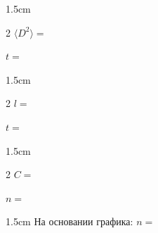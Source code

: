\begin{answerbox}{1.5cm}
\begin{multicols}{2}
\(\langle D^2\rangle=\)

\columnbreak

\(t=\)
\end{multicols}
\end{answerbox}

\begin{answerbox}{1.5cm}
\begin{multicols}{2}
\(l=\)

\columnbreak

\(t=\)
\end{multicols}
\end{answerbox}

\begin{answerbox}{1.5cm}
\begin{multicols}{2}
\(C=\)

\columnbreak

\(n=\)
\end{multicols}
\end{answerbox}

\begin{answerbox}{1.5cm}
На основании графика: \(n=\)
\end{answerbox}